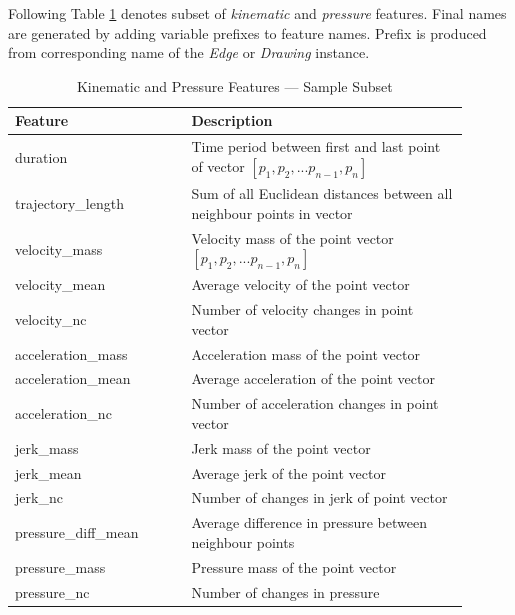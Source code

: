 Following Table \ref{features-kinematic} denotes subset of \textit{kinematic} and \textit{pressure} features. Final names are generated by adding variable prefixes to feature names. Prefix is produced from corresponding name of the \textit{Edge} or \textit{Drawing} instance.


\begin{table}[htb]
\centering
\begin{tabular}{p{0.35\linewidth} | p{0.55\linewidth}}
\hline
Feature & Description \\
\hline
duration & Time period between first and last point of vector $[p_1, p_{2}, ... p_{n-1}, p_n]$\\
trajectory\_length & Sum of all Euclidean distances between all neighbour points in vector \\
velocity\_mass & Velocity mass of the point vector $[p_1, p_{2}, ... p_{n-1}, p_n]$ \\
velocity\_mean & Average velocity of the point vector \\
velocity\_nc & Number of velocity changes in point vector \\
acceleration\_mass & Acceleration mass of the point vector \\
acceleration\_mean & Average acceleration of the point vector \\
acceleration\_nc & Number of acceleration changes in point vector \\
jerk\_mass & Jerk mass of the point vector \\
jerk\_mean & Average jerk of the point vector \\
jerk\_nc & Number of changes in jerk of point vector \\
pressure\_diff\_mean & Average difference in pressure between neighbour points \\
pressure\_mass & Pressure mass of the point vector \\
pressure\_nc & Number of changes in pressure \\
\hline
\end{tabular}
\caption{Kinematic and Pressure Features --- Sample Subset}
\label{features-kinematic}
\end{table}


    
    
    
    


